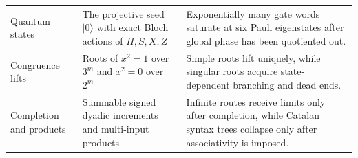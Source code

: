 \begin{longtable}{L{0.17\textwidth}L{0.29\textwidth}L{0.43\textwidth}}
Quantum states & The projective seed $|0\rangle$ with exact Bloch actions of $H,S,X,Z$ & Exponentially many gate words saturate at six Pauli eigenstates after global phase has been quotiented out. \\
Congruence lifts & Roots of $x^2=1$ over $3^m$ and $x^2=0$ over $2^m$ & Simple roots lift uniquely, while singular roots acquire state-dependent branching and dead ends. \\
Completion and products & Summable signed dyadic increments and multi-input products & Infinite routes receive limits only after completion, while Catalan syntax trees collapse only after associativity is imposed. \\
\bottomrule
\end{longtable}
